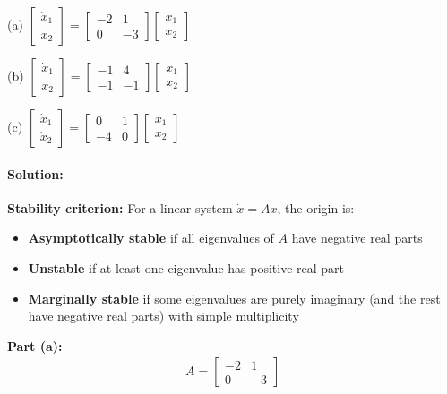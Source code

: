 \documentclass[11pt,a4paper]{article}
\begin{document}
(a) $\begin{bmatrix} \dot{x}_1 \\ \dot{x}_2 \end{bmatrix} = \begin{bmatrix} -2 & 1 \\ 0 & -3 \end{bmatrix}\begin{bmatrix} x_1 \\ x_2 \end{bmatrix}$

(b) $\begin{bmatrix} \dot{x}_1 \\ \dot{x}_2 \end{bmatrix} = \begin{bmatrix} -1 & 4 \\ -1 & -1 \end{bmatrix}\begin{bmatrix} x_1 \\ x_2 \end{bmatrix}$

(c) $\begin{bmatrix} \dot{x}_1 \\ \dot{x}_2 \end{bmatrix} = \begin{bmatrix} 0 & 1 \\ -4 & 0 \end{bmatrix}\begin{bmatrix} x_1 \\ x_2 \end{bmatrix}$

\paragraph{Solution:}

\textbf{Stability criterion:} For a linear system $\dot{x} = Ax$, the origin is:
\begin{itemize}
  \item \textbf{Asymptotically stable} if all eigenvalues of $A$ have negative real parts
  \item \textbf{Unstable} if at least one eigenvalue has positive real part
  \item \textbf{Marginally stable} if some eigenvalues are purely imaginary (and the rest have negative real parts) with simple multiplicity
\end{itemize}

\textbf{Part (a):}
\begin{align}
  A = \begin{bmatrix} -2 & 1 \\ 0 & -3 \end{bmatrix}
\end{align}
\end{document}
